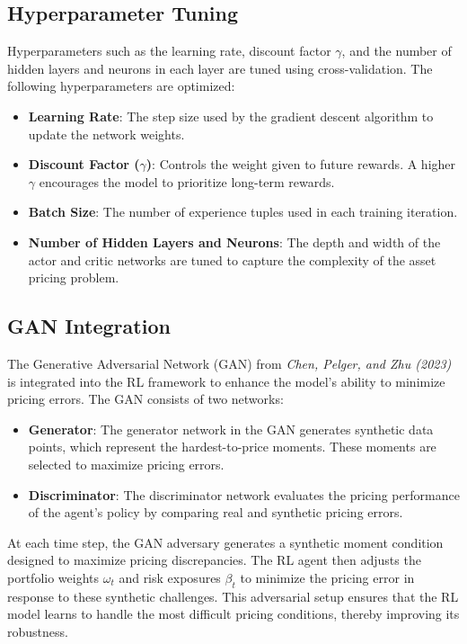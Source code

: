 \subsection{Hyperparameter Tuning}

Hyperparameters such as the learning rate, discount factor $\gamma$, and the number of hidden layers and neurons in each layer are tuned using cross-validation. The following hyperparameters are optimized:
\begin{itemize}
    \item \textbf{Learning Rate}: The step size used by the gradient descent algorithm to update the network weights.
    \item \textbf{Discount Factor ($\gamma$)}: Controls the weight given to future rewards. A higher $\gamma$ encourages the model to prioritize long-term rewards.
    \item \textbf{Batch Size}: The number of experience tuples used in each training iteration.
    \item \textbf{Number of Hidden Layers and Neurons}: The depth and width of the actor and critic networks are tuned to capture the complexity of the asset pricing problem.
\end{itemize}

\subsection{GAN Integration}

The Generative Adversarial Network (GAN) from \textit{Chen, Pelger, and Zhu (2023)} is integrated into the RL framework to enhance the model's ability to minimize pricing errors. The GAN consists of two networks:
\begin{itemize}
    \item \textbf{Generator}: The generator network in the GAN generates synthetic data points, which represent the hardest-to-price moments. These moments are selected to maximize pricing errors.
    \item \textbf{Discriminator}: The discriminator network evaluates the pricing performance of the agent's policy by comparing real and synthetic pricing errors.
\end{itemize}

At each time step, the GAN adversary generates a synthetic moment condition designed to maximize pricing discrepancies. The RL agent then adjusts the portfolio weights $\omega_t$ and risk exposures $\beta_t$ to minimize the pricing error in response to these synthetic challenges. This adversarial setup ensures that the RL model learns to handle the most difficult pricing conditions, thereby improving its robustness.
